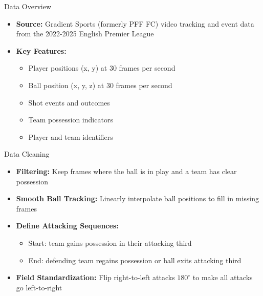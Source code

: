 \documentclass{beamer}
\begin{document}
\begin{frame}{Data Overview}
\begin{itemize}
\item \textbf{Source:} Gradient Sports (formerly PFF FC) video tracking and event data from the 2022-2025 English Premier League
\item \textbf{Key Features:}
  \begin{itemize}
  \item Player positions (x, y) at 30 frames per second
  \item Ball position (x, y, z) at 30 frames per second
  \item Shot events and outcomes
  \item Team possession indicators
  \item Player and team identifiers
  \end{itemize}
\end{itemize}
\end{frame}

\begin{frame}{Data Cleaning}
\begin{itemize}
\item \textbf{Filtering:} Keep frames where the ball is in play and a team has clear possession
\item \textbf{Smooth Ball Tracking:} Linearly interpolate ball positions to fill in missing frames
\item \textbf{Define Attacking Sequences:}
  \begin{itemize}
  \item Start: team gains possession in their attacking third
  \item End: defending team regains possession or ball exits attacking third
  \end{itemize}
\item \textbf{Field Standardization:} Flip right-to-left attacks $180^{\circ}$ to make all attacks go left-to-right
\end{itemize}
\end{frame}
\end{document}
